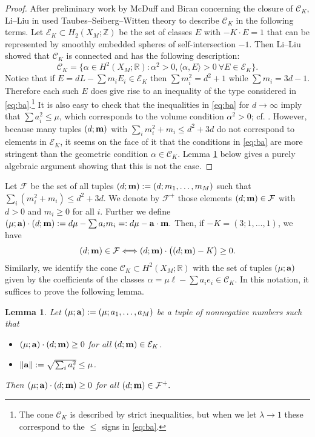 \documentclass[11pt]{amsart}
\newcommand{\labell}[1] {\label{#1}}
\newcommand{\1}{{{\mathchoice {\rm 1\mskip-4mu l} {\rm 1\mskip-4mu l}
{\rm 1\mskip-4.5mu l} {\rm 1\mskip-5mu l}}}}
\newcommand{\ba} {{\bf a}}
\newcommand{\bm} {{\bf m}}
\newcommand{\al}{{\alpha}}
\newcommand{\la}{{\lambda}}
\newcommand{\Cc}{{\mathcal C}}
\newcommand{\Ff}{{\mathcal F}}
\newcommand{\Ee}{{\mathcal E}}
\newcommand{\R}{{\mathbb R}}
\newcommand{\Z}{{\mathbb Z}}
\newtheorem{lemma}[theorem]{Lemma}
\numberwithin{figure}{section}
\numberwithin{equation}{section}
\begin{document}
\begin{proof}
 After preliminary work by McDuff \cite{Mdef} and Biran \cite{B} concerning the closure of $\Cc_K$,
 Li--Liu in \cite[Theorem~3]{LL}  used 
 Taubes--Seiberg--Witten theory to describe $\Cc_K$ 
  in the following terms.
 Let $\Ee_K\subset H_2(X_M;\Z)$ be the set of classes $E$ with 
 $-K\cdot E = 1$  that can be represented by smoothly 
 embedded spheres of self-intersection $-1$.  Then  Li--Liu showed that $\Cc_K$ is  connected and has the following description:
$$
\Cc_K = \{\al\in H^2(X_M;\R): \al^2>0, \langle 
\al,E\rangle>0\ \forall E\in \Ee_K\}.
$$
Notice that if $E = dL-\sum m_iE_i \in \Ee_K$ then
$\sum m_i^2 = d^2 + 1$ while $\sum m_i = 3d-1$.   Therefore each such $E$ does give rise to an inequality of the type considered in
\eqref{eq:ba}.\footnote
{
The cone $\Cc_K$ is described by strict inequalities, but when we let $\la\to 1$ these correspond to the $\le$ signs in \eqref{eq:ba}.} 
It is also easy to check that the inequalities in 
 \eqref{eq:ba} for $d\to \infty$ imply that $\sum a_i^2\le \mu$, which corresponds to 
 the volume condition $\al^2>0$; cf. \cite[Remark~3.13]{H}.
However, because  many tuples $(d;\bm)$ with 
$\sum_i m_i^2 + m_i \le d^2 + 3d$ do not correspond to elements in $\Ee_K$, it seems on the face of it that the conditions in
\eqref{eq:ba} are more stringent than the geometric condition $\al\in \Cc_K$. 
Lemma \ref{le:alg} below gives a purely algebraic argument 
 showing that this is not the case.
 \end{proof}

Let $\Ff$ be the set of all tuples $(d;\bm): = (d;m_1,\dots,m_M)$
such that $\sum_i(m_i^2 + m_i) \le d^2 + 3d$. 
We denote by $\Ff^+$ those elements $(d;\bm)\in \Ff$ with $d>0$ and $m_i\ge 0$ for all $i$.
Further we define $(\mu;\ba)\cdot (d;\bm): = d\mu -\sum a_i m_i=: d\mu-\ba\cdot \bm.$  Then, if $-K=(3;1,\dots,1)$, we have
$$ 
(d;\bm)\in \Ff\Longleftrightarrow (d;\bm)\cdot\big((d;\bm) - K\bigr)  \ge 0.
$$
Similarly, we  identify the cone $\Cc_K\subset H^2(X_M;\R)$ 
with the set of tuples $(\mu;\ba)$
given by the coefficients of the classes 
 $\al=\mu \ell -\sum a_ie_i\in \Cc_K$. In this notation, it suffices 
 to prove the following lemma.

\begin{lemma}\labell{le:alg}
Let $(\mu;\ba): = (\mu; a_1,\dots,a_M)$ be a tuple of nonnegative numbers such that 
\begin{itemize}\item[(i)]
$(\mu;\ba)\cdot (d;\bm)\ge 0$ for all $(d;\bm)\in \Ee_K$.
\item[(ii)] $\|\ba\|: = \sqrt {\sum_i a_i^2}\le \mu$.
\end{itemize}
Then $(\mu;\ba)\cdot (d;\bm)\ge 0$ for all  $(d;\bm)\in \Ff^+.$ 
\end{lemma}
\end{document}
